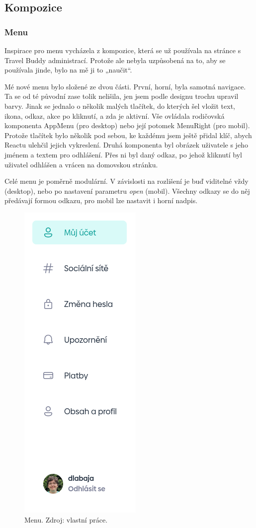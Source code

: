 \subsection{Kompozice}

\subsubsection{Menu}
Inspirace pro menu vycházela z kompozice, která se už používala na stránce s Travel Buddy administrací. Protože ale nebyla uzpůsobená na to, aby se používala jinde, bylo na mě ji to „naučit“.

Mé nové menu bylo složené ze dvou části. První, horní, byla samotná navigace. Ta se od té původní zase tolik nelišila, jen jsem podle designu trochu upravil barvy. Jinak se jednalo o několik malých tlačítek, do kterých šel vložit text, ikona, odkaz, akce po kliknutí, a zda je aktivní. Vše ovládala rodičovská komponenta AppMenu (pro desktop) nebo její potomek MenuRight (pro mobil). Protože tlačítek bylo několik pod sebou, ke každému jsem ještě přidal klíč, abych Reactu ulehčil jejich vykreslení. Druhá komponenta byl obrázek uživatele s jeho jménem a textem pro odhlášení. Přes ni byl daný odkaz, po jehož kliknutí byl uživatel odhlášen a vrácen na domovskou stránku.

Celé menu je poměrně modulární. V závislosti na rozlišení je buď viditelné vždy (desktop), nebo po nastavení parametru \textit{open} (mobil). Všechny odkazy se do něj předávají formou odkazu, pro mobil lze nastavit i horní nadpis.

\begin{figure}[!h]
    \centering
    \includegraphics[width=0.24\linewidth]{obrazky/menu.png}
    \caption{Menu. Zdroj: vlastní práce.}
\end{figure}


